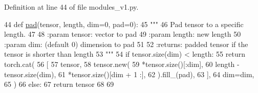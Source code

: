 Definition at line 44 of file modules\+\_\+v1.\+py.


\begin{DoxyCode}
44 \textcolor{keyword}{def }\hyperlink{namespaceparlai_1_1agents_1_1legacy__agents_1_1seq2seq_1_1modules__v1_ab71a48e82c903a3a22ff0b000c461922}{pad}(tensor, length, dim=0, pad=0):
45     \textcolor{stringliteral}{"""}
46 \textcolor{stringliteral}{    Pad tensor to a specific length.}
47 \textcolor{stringliteral}{}
48 \textcolor{stringliteral}{    :param tensor: vector to pad}
49 \textcolor{stringliteral}{    :param length: new length}
50 \textcolor{stringliteral}{    :param dim: (default 0) dimension to pad}
51 \textcolor{stringliteral}{}
52 \textcolor{stringliteral}{    :returns: padded tensor if the tensor is shorter than length}
53 \textcolor{stringliteral}{    """}
54     \textcolor{keywordflow}{if} tensor.size(dim) < length:
55         \textcolor{keywordflow}{return} torch.cat(
56             [
57                 tensor,
58                 tensor.new(
59                     *tensor.size()[:dim],
60                     length - tensor.size(dim),
61                     *tensor.size()[dim + 1 :],
62                 ).fill\_(pad),
63             ],
64             dim=dim,
65         )
66     \textcolor{keywordflow}{else}:
67         \textcolor{keywordflow}{return} tensor
68 
69 
\end{DoxyCode}
